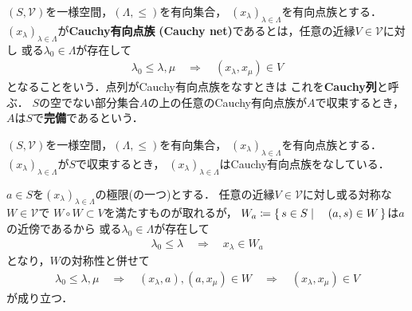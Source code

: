 	\begin{screen}
		\begin{dfn}
			$(S,\mathscr{V})$を一様空間，$(\Lambda,\leq)$を有向集合，
			$(x_\lambda)_{\lambda \in \Lambda}$を有向点族とする．
			$(x_\lambda)_{\lambda \in \Lambda}$が{\bf Cauchy有向点族}
			{\bf (Cauchy net)}であるとは，任意の近縁$V \in \mathscr{V}$に対し
			或る$\lambda_0 \in \Lambda$が存在して
			\begin{align}
				\lambda_0 \leq \lambda,\mu
				\quad \Longrightarrow \quad
				(x_\lambda,x_\mu) \in V
			\end{align}
			となることをいう．点列がCauchy有向点族をなすときは
			これを{\bf Cauchy列}と呼ぶ．
			$S$の空でない部分集合$A$の上の任意のCauchy有向点族が$A$で収束するとき，
			$A$は$S$で{\bf 完備}であるという．
		\end{dfn}
	\end{screen}
	
	\begin{screen}
		\begin{thm}[収束する有向点族はCauchy有向点族]\label{thm:convergent_net_is_Cauchy}
			$(S,\mathscr{V})$を一様空間，$(\Lambda,\leq)$を有向集合，
			$(x_\lambda)_{\lambda \in \Lambda}$を有向点族とする．
			$(x_\lambda)_{\lambda \in \Lambda}$が$S$で収束するとき，
			$(x_\lambda)_{\lambda \in \Lambda}$はCauchy有向点族をなしている．
		\end{thm}
	\end{screen}
	
	\begin{prf}
		$a \in S$を$(x_\lambda)_{\lambda \in \Lambda}$の極限(の一つ)とする．
		任意の近縁$V \in \mathscr{V}$に対し或る対称な$W \in \mathscr{V}$で
		$W \circ W \subset V$を満たすものが取れるが，
		$W_a \coloneqq \left\{\, s \in S \mid \quad (a,s) \in W\, \right\}$は$a$の近傍であるから
		或る$\lambda_0 \in \Lambda$が存在して
		\begin{align}
			\lambda_0 \leq \lambda \quad \Longrightarrow \quad
			x_\lambda \in W_a
		\end{align}
		となり，$W$の対称性と併せて
		\begin{align}
			\lambda_0 \leq \lambda,\mu \quad \Longrightarrow \quad
			(x_\lambda,a),(a,x_\mu) \in W \quad \Longrightarrow \quad
			(x_\lambda,x_\mu) \in V
		\end{align}
		が成り立つ．
		\QED
	\end{prf}
	
